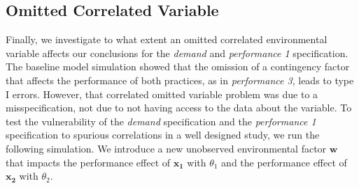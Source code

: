 \documentclass[12pt]{article}
\begin{document}
% 
% 

\subsection{Omitted Correlated Variable}

Finally, we investigate to what extent an omitted correlated environmental variable affects our conclusions for the \emph{demand} and \emph{performance 1} specification. The baseline model simulation showed that the omission of a contingency factor that affects the performance of both practices, as in \emph{performance 3}, leads to type I errors. However, that correlated omitted variable problem was due to a misspecification, not due to not having access to the data about the variable. To test the vulnerability of the \emph{demand} specification and the \emph{performance 1} specification to spurious correlations in a well designed study, we run the following simulation. We introduce a new unobserved environmental factor \(\mathbf{w}\) that impacts the performance effect of \(\mathbf{x_1}\) with \(\theta_1\) and the performance effect of \(\mathbf{x_2}\) with \(\theta_2\). 
\end{document}
